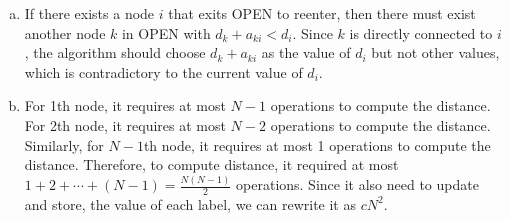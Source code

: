 \documentclass{article}
\begin{document}
    \begin{enumerate}[(a)]
        \item If there exists a node $i$ that exits OPEN to reenter, then there must exist another node $k$ in OPEN with $d_k+a_{ki}<d_i$. Since $k$ is directly connected to $i$, the algorithm should choose $d_k+a_{ki}$ as the value of $d_i$ but not other values, which is contradictory to the current value of $d_i$.
        \item For 1th node, it requires at most $N-1$ operations to compute the distance. For 2th node, it requires at most $N-2$ operations to compute the distance. Similarly, for $N-1$th node, it requires at most 1 operations to compute the distance. Therefore, to compute distance, it required at most $1+2+\cdots+(N-1)=\frac{N(N-1)}{2}$ operations. Since it also need to update and store, the value of each label, we can rewrite it as $cN^2$.
        
    \end{enumerate}
\end{document}
